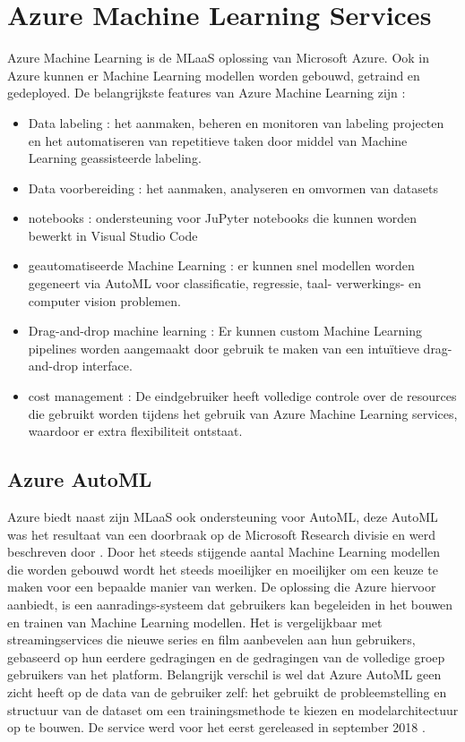 \section{Azure Machine Learning Services}
Azure Machine Learning is de MLaaS oplossing van Microsoft Azure. Ook in Azure kunnen er Machine Learning modellen worden gebouwd, getraind en gedeployed. De belangrijkste features van Azure Machine Learning zijn : 
\begin{itemize}
    \item Data labeling : het aanmaken, beheren en monitoren van labeling projecten en het automatiseren van repetitieve taken door middel van Machine Learning geassisteerde labeling. 
    \item Data voorbereiding : het aanmaken, analyseren en omvormen van datasets
    \item notebooks : ondersteuning voor JuPyter notebooks die kunnen worden bewerkt in Visual Studio Code
    \item geautomatiseerde Machine Learning : er kunnen snel modellen worden gegeneert via AutoML voor classificatie, regressie, taal- verwerkings- en computer vision problemen. 
    \item Drag-and-drop machine learning : Er kunnen custom Machine Learning pipelines worden aangemaakt door gebruik te maken van een intuïtieve drag-and-drop interface. 
    \item cost management : De eindgebruiker heeft volledige controle over de resources die gebruikt worden tijdens het gebruik van Azure Machine Learning services, waardoor er extra flexibiliteit ontstaat. 
\end{itemize}
\subsection{Azure AutoML}
Azure biedt naast zijn MLaaS ook ondersteuning voor AutoML, deze AutoML was het resultaat van een doorbraak op de Microsoft Research divisie en werd beschreven door \textcite{Sheth2018}. Door het steeds stijgende aantal Machine Learning modellen die worden gebouwd wordt het steeds moeilijker en moeilijker om een keuze te maken voor een bepaalde manier van werken. De oplossing die Azure hiervoor aanbiedt, is een aanradings-systeem dat gebruikers kan begeleiden in het bouwen en trainen van Machine Learning modellen. Het is vergelijkbaar met streamingservices die nieuwe series en film aanbevelen aan hun gebruikers, gebaseerd op hun eerdere gedragingen en de gedragingen van de volledige groep gebruikers van het platform. Belangrijk verschil is wel dat Azure AutoML geen zicht heeft op de data van de gebruiker zelf: het gebruikt de probleemstelling en structuur van de dataset om een trainingsmethode te kiezen en modelarchitectuur op te bouwen. De service werd voor het eerst gereleased in september 2018 \autocite{Mukunthu2018}. 


